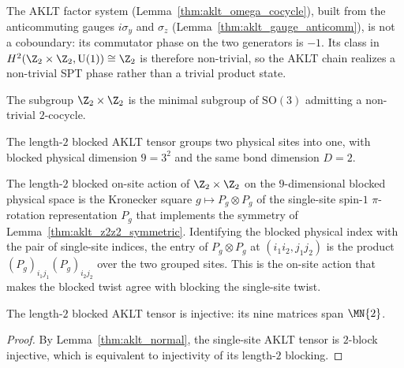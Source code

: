 \begin{lemma}\label{thm:aklt_nontrivial_spt}
    \leanok
    The AKLT factor system (Lemma~\ref{thm:aklt_omega_cocycle}), built from the
    anticommuting gauges $i\sigma_y$ and $\sigma_z$
    (Lemma~\ref{thm:aklt_gauge_anticomm}), is not a coboundary: its commutator
    phase on the two generators is $-1$. Its class in
    $H^2(\Z_2 \times \Z_2, \mathrm{U}(1)) \cong \Z_2$ is therefore non-trivial,
    so the AKLT chain realizes a non-trivial SPT phase rather than a trivial
    product state.
\end{lemma}

\begin{remark}\label{rem:aklt_z2z2_spt}
    The subgroup $\Z_2 \times \Z_2$ is the minimal subgroup of $\mathrm{SO}(3)$
    admitting a non-trivial $2$-cocycle.
\end{remark}

\begin{definition}\label{def:aklt_blocked}
    \leanok
    The length-$2$ blocked AKLT tensor groups two physical sites into one, with
    blocked physical dimension $9 = 3^2$ and the same bond dimension $D = 2$.
\end{definition}

\begin{definition}%
    \label{def:aklt_blocked_z2z2_action}
    \leanok
    The length-$2$ blocked on-site action of $\Z_2 \times \Z_2$ on the
    $9$-dimensional blocked physical space is the Kronecker square
    $g \longmapsto P_g \otimes P_g$ of the single-site spin-$1$
    $\pi$-rotation representation $P_g$ that implements the symmetry of
    Lemma~\ref{thm:aklt_z2z2_symmetric}. Identifying the blocked physical
    index with the pair of single-site indices, the entry of
    $P_g \otimes P_g$ at $(i_1 i_2, j_1 j_2)$ is the product
    $(P_g)_{i_1 j_1}(P_g)_{i_2 j_2}$ over the two grouped sites. This is the
    on-site action that makes the blocked twist agree with blocking the
    single-site twist.
\end{definition}

\begin{lemma}\label{thm:aklt_blocked_injective}
    \leanok
    The length-$2$ blocked AKLT tensor is injective: its nine matrices span
    $\MN{2}$.
\end{lemma}
\begin{proof}
    \leanok
    By Lemma~\ref{thm:aklt_normal}, the single-site AKLT tensor is $2$-block
    injective, which is equivalent to injectivity of its length-$2$ blocking.
\end{proof}

